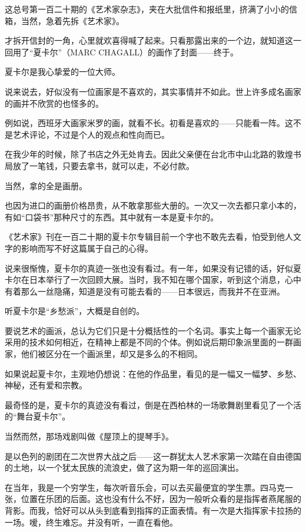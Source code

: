 \par 这总号第一百二十期的《艺术家杂志》，夹在大批信件和报纸里，挤满了小小的信箱，当然，急着先拆《艺术家》。
\par 才拆开信封的一角，心里就欢喜得喊了起来。只看那露出来的一个边，就知道这一回用了“夏卡尔”（MARC CHAGALL）的画作了封面——终于。
\par 夏卡尔是我心挚爱的一位大师。
\par 说来说去，好似没有一位画家是不喜欢的，其实事情并不如此。世上许多成名画家的画并不欣赏的也怪多的。
\par 例如说，西班牙大画家米罗的画，就看不长。初看是喜欢的——只能看一阵。这不是艺术评论，不过是个人的观点和性向而已。
\par 在我少年的时候，除了书店之外无处肯去。因此父亲便在台北市中山北路的敦煌书局放了一笔钱，只要去拿书，就可以走，不必付款。
\par 当然，拿的全是画册。
\par 也因为进口的画册价格昂贵，从不敢拿那些大册的。一次又一次去都只拿小本的，有如“口袋书”那种尺寸的东西。其中就有一本是夏卡尔的。
\par 《艺术家》刊在一百二十期的夏卡尔专辑目前一个字也不敢先去看，怕受到他人文字的影响而写不好这篇属于自己的心得。
\par 说来很惭愧，夏卡尔的真迹一张也没有看过。有一年，如果没有记错的话，好似夏卡尔在日本举行了一次回顾大展。当时，我不知在哪个国家，听到这个消息，心中有着那么一丝隐痛，知道是没有可能去看的——日本很远，而我并不在亚洲。
\par 听夏卡尔是“乡愁派”，大概是自创的。
\par 要说艺术的画派，总认为它们只是十分概括性的一个名词。事实上每一个画家无论采用的技术如何相近，在精神上都是不同的个体。例如说后期印象派里面的一群画家，他们被区分在一个画派里，却又是多么的不相同。
\par 如果说起夏卡尔，主观地仍想说：在他的作品里，看见的是一幅又一幅梦、乡愁、神秘，还有爱和宗教。
\par 最奇怪的是，夏卡尔的真迹没有看过，倒是在西柏林的一场歌舞剧里看见了一个活的“舞台夏卡尔”。
\par 当然而然，那场戏剧叫做《屋顶上的提琴手》。
\par 是以色列的剧团在二次世界大战之后——这一群犹太人艺术家第一次踏在自由德国的土地，以一个犹太民族的流浪史，做了这为期一年的巡回演出。
\par 在当年，我是一个穷学生，每次听音乐会，可以去买最便宜的学生票。四马克一张，位置在乐团的后面。这也没有什么不好，因为一般听众看的是指挥者燕尾服的背影。而我，恰好可以从头到底看到指挥的正面表情。有一次是大指挥家卡拉扬的一场。嗳，终生难忘。并没有听，一直在看他。
